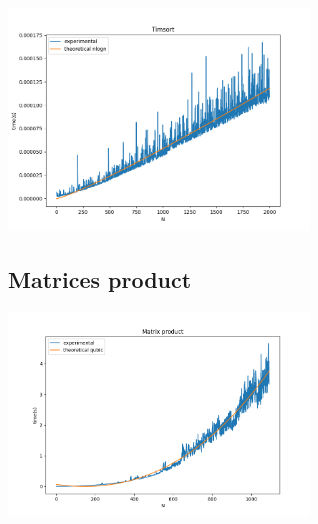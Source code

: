 \begin{center}
    \includegraphics[width=0.6\textwidth]{../results/timsort.png}
\end{center}

\subsection*{Matrices product}

\begin{center}
    \includegraphics[width=0.6\textwidth]{../results/matrix_product.png}
\end{center}